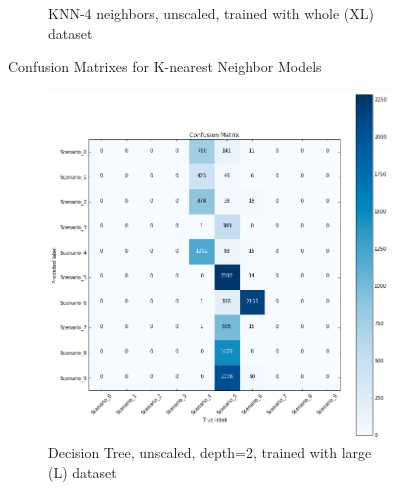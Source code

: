 \begin{figure}[!htb]
\begin{subfigure}[htb]{0.49\textwidth}
        \caption{KNN-4 neighbors, unscaled, trained with whole (XL) dataset}
        \label{fig:knn_4}
    \end{subfigure}
    \caption{Confusion Matrixes for K-nearest Neighbor Models}
    \label{fig:confusionknn}
\end{figure}

\begin{figure}[!htb]
    \captionsetup[subfigure]{justification=centering}
    \centering
    \begin{subfigure}[htb]{0.49\textwidth}
        \centering
        \includegraphics[width=\linewidth]{figures/dtc_unscaled_L_2}
        \caption{Decision Tree, unscaled, depth=2, trained with large (L) dataset}
        \label{fig:knn_2}
    \end{subfigure}
    \begin{subfigure}[htb]{0.49\textwidth}
        \centering

\end{subfigure}
\end{figure}
